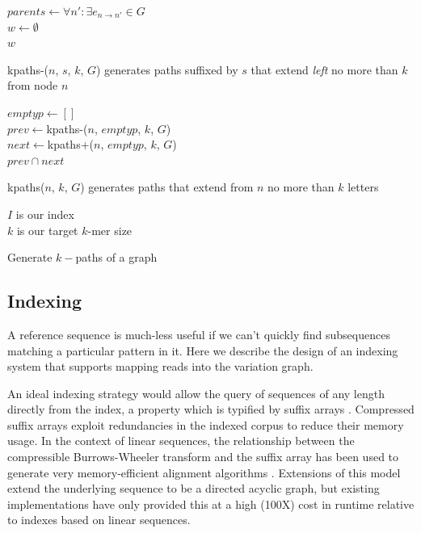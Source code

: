 \documentclass{article}
\begin{document}
\begin{function}[h!]
  \label{func:kpaths-}
  $parents \gets \forall n' : \exists e_{n \rightarrow n'} \in G$ \\
  $w \gets \emptyset$ \\
  \Return $w$
  \caption{kpaths-($n$, $s$, $k$, $G$) generates paths suffixed by $s$ that extend \emph{left} no more than $k$ from node $n$ }
\end{function}

\begin{function}[h!]
  \label{func:kpaths}
  $emptyp \gets []$ \\
  $prev \gets $kpaths-($n$, $emptyp$, $k$, $G$) \\
  $next \gets $kpaths+($n$, $emptyp$, $k$, $G$) \\
  \Return $prev \cap next$
  \caption{kpaths($n$, $k$, $G$) generates paths that extend from $n$ no more than $k$ letters }
\end{function}

\begin{algorithm}[h!]
  $I$ is our index \\
  $k$ is our target $k$-mer size \\
  \caption{
\label{alg:kpaths}
Generate $k-$paths of a graph
}
\end{algorithm}


\subsection{Indexing}

A reference sequence is much-less useful if we can't quickly find subsequences matching a particular pattern in it. Here we describe the design of an indexing system that supports mapping reads into the variation graph.

An ideal indexing strategy would allow the query of sequences of any length directly from the index, a property which is typified by suffix arrays \cite{puglisi2007taxonomy}. Compressed suffix arrays exploit redundancies in the indexed corpus to reduce their memory usage. In the context of linear sequences, the relationship between the compressible Burrows-Wheeler transform and the suffix array has been used to generate very memory-efficient alignment algorithms \cite{li2013aligning}. Extensions of this model extend the underlying sequence to be a directed acyclic graph, but existing implementations have only provided this at a high (100X) cost in runtime \cite{siren2011indexing, huang2013short} relative to indexes based on linear sequences.
\end{document}
